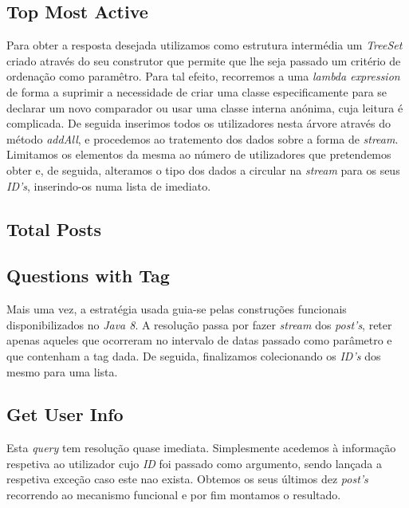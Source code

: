 \documentclass[a4paper, 11pt, oneside]{article}
\begin{document}
\subsection{Top Most Active}

Para obter a resposta desejada utilizamos como estrutura intermédia um \textit{TreeSet} criado através do seu construtor que permite que lhe seja passado um critério de ordenação como paramêtro. Para tal efeito, recorremos a uma \textit{lambda expression} de forma a suprimir a necessidade de criar uma classe especificamente para se declarar um novo comparador ou usar uma classe interna anónima, cuja leitura é complicada. De seguida inserimos todos os utilizadores nesta árvore através do método \textit{addAll}, e procedemos ao tratemento dos dados sobre a forma de \textit{stream}. Limitamos os elementos da mesma ao número de utilizadores que pretendemos obter e, de seguida, alteramos o tipo dos dados a circular na \textit{stream} para os seus \textit{ID's}, inserindo-os numa lista de imediato.



\subsection{Total Posts}





\subsection{Questions with Tag}

Mais uma vez, a estratégia usada guia-se pelas construções funcionais disponibilizados no \textit{Java 8}. A resolução passa por fazer \textit{stream} dos \textit{post's}, reter apenas aqueles que ocorreram no intervalo de datas passado como parâmetro e que contenham a tag dada. De seguida, finalizamos colecionando os \textit{ID's} dos mesmo para uma lista.


\subsection{Get User Info}

Esta \textit{query} tem resolução quase imediata. Simplesmente acedemos à informação respetiva ao utilizador cujo \textit{ID} foi passado como argumento, sendo lançada a respetiva exceção caso este nao exista. Obtemos os seus últimos dez \textit{post's} recorrendo ao mecanismo funcional e por fim montamos o resultado.
\end{document}
